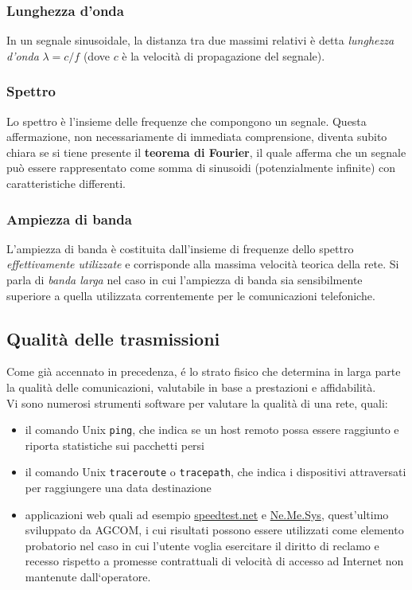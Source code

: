 \documentclass[a4paper,11pt]{article}
\def\code#1{\texttt{#1}}
\def\subsub#1{\subsubsection{#1}\label{#1}}
\begin{document}
\subsubsection{Lunghezza d'onda}
In un segnale sinusoidale, la distanza tra due massimi relativi è detta \textit{lunghezza d'onda} $\lambda =c/f$ (dove $c$ è la velocità di propagazione del segnale).

\subsub{Spettro}
Lo spettro è l'insieme delle frequenze che compongono un segnale. Questa affermazione, non necessariamente di immediata comprensione, diventa subito chiara se si tiene presente il \textbf{teorema di Fourier}, il quale afferma che un segnale può essere rappresentato come somma di sinusoidi (potenzialmente infinite) con caratteristiche differenti.

\subsub{Ampiezza di banda}
L'ampiezza di banda è costituita dall'insieme di frequenze dello spettro \textit{effettivamente utilizzate} e corrisponde alla massima velocità teorica della rete. Si parla di \textit{banda larga} nel caso in cui l'ampiezza di banda sia sensibilmente superiore a quella utilizzata correntemente per le comunicazioni telefoniche.

\subsection{Qualità delle trasmissioni}
Come già accennato in precedenza, é lo strato fisico che determina in larga parte la qualità delle comunicazioni, valutabile in base a prestazioni e affidabilità. 
\\Vi sono numerosi strumenti software per valutare la qualità di una rete, quali:
\begin{itemize}
\item il comando Unix \code{ping}, che indica se un host remoto possa essere raggiunto e riporta statistiche sui pacchetti persi
\item il comando Unix \code{traceroute} o \code{tracepath}, che indica i dispositivi attraversati per raggiungere una data destinazione
\item applicazioni web quali ad esempio \url{speedtest.net} e \href{<https://www.misurainternet.it/>}{Ne.Me.Sys}, quest'ultimo sviluppato da AGCOM, i cui risultati possono essere utilizzati come elemento probatorio nel caso in cui l’utente voglia esercitare il diritto di reclamo e recesso rispetto a promesse contrattuali di velocità di accesso ad Internet non mantenute dall‘operatore.
\end{itemize}
\end{document}
